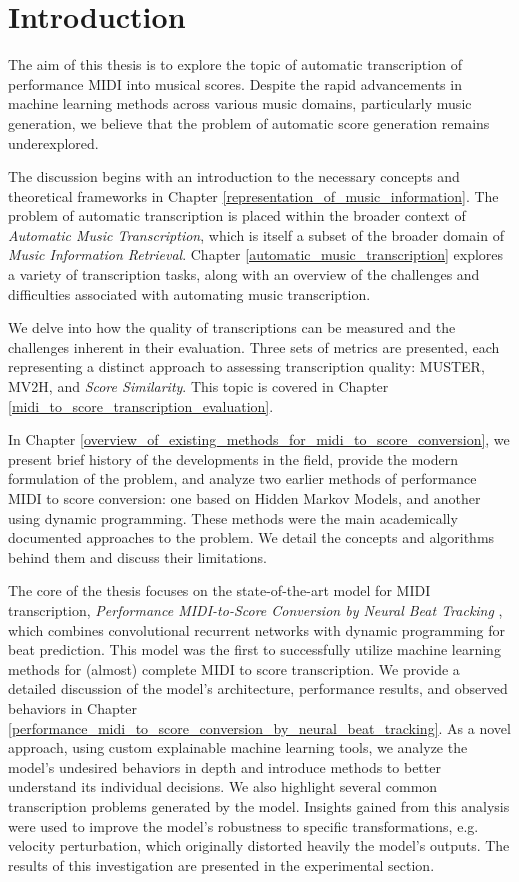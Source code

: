 \chapter*{Introduction}


The aim of this thesis is to explore the topic of automatic transcription of performance MIDI into musical scores. Despite the rapid advancements in machine learning methods across various music domains, particularly music generation, we believe that the problem of automatic score generation remains underexplored.

The discussion begins with an introduction to the necessary concepts and theoretical frameworks in Chapter \ref{representation_of_music_information}. The problem of automatic transcription is placed within the broader context of \emph{Automatic Music Transcription}, which is itself a subset of the broader domain of \emph{Music Information Retrieval}. Chapter \ref{automatic_music_transcription} explores a variety of transcription tasks, along with an overview of the challenges and difficulties associated with automating music transcription. 

We delve into how the quality of transcriptions can be measured and the challenges inherent in their evaluation. Three sets of metrics are presented, each representing a distinct approach to assessing transcription quality: MUSTER, MV2H, and \emph{Score Similarity}. This topic is covered in Chapter \ref{midi_to_score_transcription_evaluation}.

In Chapter \ref{overview_of_existing_methods_for_midi_to_score_conversion}, we present brief history of the developments in the field, provide the modern formulation of the problem, and analyze two earlier methods of performance MIDI to score conversion: one based on Hidden Markov Models, and another using dynamic programming. These methods were the main academically documented approaches to the problem. We detail the concepts and algorithms behind them and discuss their limitations.

The core of the thesis focuses on the state-of-the-art model for MIDI transcription, \emph{Performance MIDI-to-Score Conversion by Neural Beat Tracking} \cite{Liu2022}, which combines convolutional recurrent networks with dynamic programming for beat prediction. This model was the first to successfully utilize machine learning methods for (almost) complete MIDI to score transcription. We provide a detailed discussion of the model’s architecture, performance results, and observed behaviors in Chapter \ref{performance_midi_to_score_conversion_by_neural_beat_tracking}.
As a novel approach, using custom explainable machine learning tools, we analyze the model's undesired behaviors in depth and introduce methods to better understand its individual decisions. We also highlight several common transcription problems generated by the model. Insights gained from this analysis were used to improve the model's robustness to specific transformations, e.g. velocity perturbation, which originally distorted heavily the model's outputs. The results of this investigation are presented in the experimental section.

